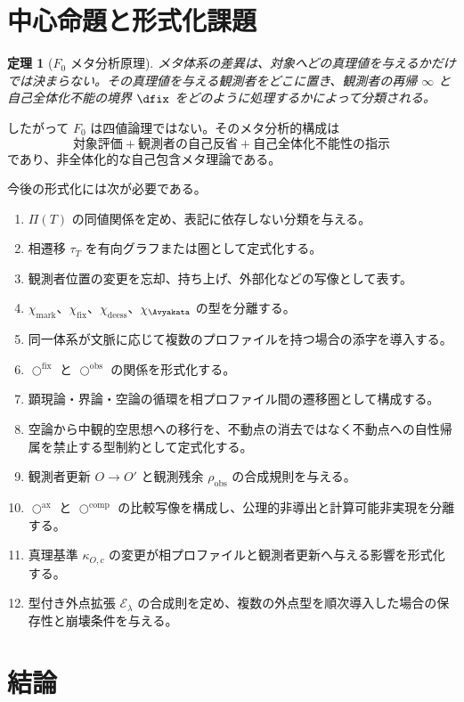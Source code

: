 \documentclass[a4paper,11pt]{ltjsarticle}
\theoremstyle{definition}
\theoremstyle{plain}
\newtheorem{theorem}[definition]{定理}
\newcommand{\Phase}{\Pi}
\newcommand{\ofix}{\bigcirc^{\mathrm{fix}}}
\newcommand{\oobs}{\bigcirc^{\mathrm{obs}}}
\newcommand{\oax}{\bigcirc^{\mathrm{ax}}}
\newcommand{\ocomp}{\bigcirc^{\mathrm{comp}}}
\newcommand{\Residual}{\rho_{\mathrm{obs}}}
\newcommand{\TruthCriterion}{\kappa}
\newcommand{\CircleExt}{\mathcal{E}}
\begin{document}
\section{中心命題と形式化課題}

\begin{theorem}[$F_0$ メタ分析原理]
メタ体系の差異は、対象へどの真理値を与えるかだけでは決まらない。その真理値を与える観測者をどこに置き、観測者の再帰 $\infty$ と自己全体化不能の境界 $\dfix$ をどのように処理するかによって分類される。
\end{theorem}

したがって $F_0$ は四値論理ではない。そのメタ分析的構成は
\[
 \text{対象評価}
 +
 \text{観測者の自己反省}
 +
 \text{自己全体化不能性の指示}
\]
であり、非全体化的な自己包含メタ理論である。

今後の形式化には次が必要である。
\begin{enumerate}
 \item $\Phase(T)$ の同値関係を定め、表記に依存しない分類を与える。
 \item 相遷移 $\tau_T$ を有向グラフまたは圏として定式化する。
 \item 観測者位置の変更を忘却、持ち上げ、外部化などの写像として表す。
 \item $\chi_{\mathrm{mark}}$、$\chi_{\mathrm{fix}}$、$\chi_{\mathrm{deess}}$、$\chi_{\Avyakata}$ の型を分離する。
 \item 同一体系が文脈に応じて複数のプロファイルを持つ場合の添字を導入する。
 \item $\ofix$ と $\oobs$ の関係を形式化する。
 \item 顕現論・界論・空論の循環を相プロファイル間の遷移圏として構成する。
 \item 空論から中観的空思想への移行を、不動点の消去ではなく不動点への自性帰属を禁止する型制約として定式化する。
 \item 観測者更新 $O\to O'$ と観測残余 $\Residual$ の合成規則を与える。
 \item $\oax$ と $\ocomp$ の比較写像を構成し、公理的非導出と計算可能非実現を分離する。
 \item 真理基準 $\TruthCriterion_{O,c}$ の変更が相プロファイルと観測者更新へ与える影響を形式化する。
 \item 型付き外点拡張 $\CircleExt_\lambda$ の合成則を定め、複数の外点型を順次導入した場合の保存性と崩壊条件を与える。
\end{enumerate}

\section{結論}
\end{document}
